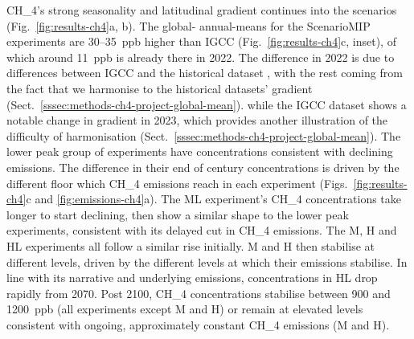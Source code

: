 CH_4's strong seasonality and latitudinal gradient continues into the scenarios (Fig.~\ref{fig:results-ch4}a, b).
The global- annual-means for the ScenarioMIP experiments are 30--35~ppb higher than IGCC (Fig.~\ref{fig:results-ch4}c, inset),
of which around 11~ppb is already there in 2022.
The difference in 2022 is due to differences between IGCC and the historical dataset \citep{nicholls_historical-ghgs_2026},
with the rest coming from the fact that we harmonise to the historical datasets' gradient (Sect.~\ref{sssec:methods-ch4-project-global-mean}).
while the IGCC dataset shows a notable change in gradient in 2023,
which provides another illustration of the difficulty of harmonisation (Sect.~\ref{sssec:methods-ch4-project-global-mean}).
The lower peak group of experiments have concentrations consistent with declining emissions.
The difference in their end of century concentrations is driven by the different floor
which CH_4 emissions reach in each experiment
(Figs.~\ref{fig:results-ch4}c and \ref{fig:emissions-ch4}a).
The ML experiment's CH_4 concentrations take longer to start declining,
then show a similar shape to the lower peak experiments,
consistent with its delayed cut in CH_4 emissions.
The M, H and HL experiments all follow a similar rise initially.
M and H then stabilise at different levels, driven by the different levels at which their emissions stabilise.
In line with its narrative and underlying emissions, concentrations in HL drop rapidly from 2070.
Post 2100, CH_4 concentrations stabilise between 900 and 1200~ppb (all experiments except M and H)
or remain at elevated levels consistent with ongoing, approximately constant CH_4 emissions (M and H).

